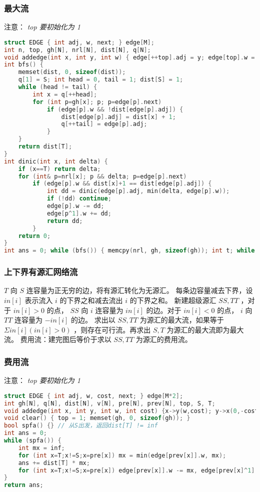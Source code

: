\documentclass{article}
\begin{document}
\subsubsection{最大流}
注意： \emph{top 要初始化为 1}
\begin{lstlisting}[language=C++]
struct EDGE { int adj, w, next; } edge[M];
int n, top, gh[N], nrl[N], dist[N], q[N];
void addedge(int x, int y, int w) { edge[++top].adj = y; edge[top].w = w; edge[top].next = gh[x]; gh[x] = top; edge[++top].adj = x; edge[top].w = 0; edge[top].next = gh[y]; gh[y] = top; }
int bfs() {
	memset(dist, 0, sizeof(dist));
	q[1] = S; int head = 0, tail = 1; dist[S] = 1;
	while (head != tail) {
		int x = q[++head];
		for (int p=gh[x]; p; p=edge[p].next)
			if (edge[p].w && !dist[edge[p].adj]) {
				dist[edge[p].adj] = dist[x] + 1;
				q[++tail] = edge[p].adj;
			}
	}
	return dist[T];
}
int dinic(int x, int delta) {
	if (x==T) return delta;
	for (int& p=nrl[x]; p && delta; p=edge[p].next)
		if (edge[p].w && dist[x]+1 == dist[edge[p].adj]) {
			int dd = dinic(edge[p].adj, min(delta, edge[p].w));
			if (!dd) continue;
			edge[p].w -= dd;
			edge[p^1].w += dd;
			return dd;
		}
	return 0;
}
int ans = 0; while (bfs()) { memcpy(nrl, gh, sizeof(gh)); int t; while (t = dinic(S, inf)) ans += t; } return ans;
\end{lstlisting}
\subsubsection{上下界有源汇网络流}

$T$ 向 $S$ 连容量为正无穷的边，将有源汇转化为无源汇。
每条边容量减去下界，设 $in[i]$ 表示流入 $i$ 的下界之和减去流出 $i$ 的下界之和。  
新建超级源汇 $SS, TT$ ，对于 $in[i] > 0$ 的点， $SS$ 向 $i$ 连容量为 $in[i]$ 的边。对于 $in[i] < 0$ 的点， $i$ 向 $TT$ 连容量为 $-in[i]$ 的边。 
求出以 $SS, TT$ 为源汇的最大流，如果等于 $\Sigma in[i] (in[i]>0)$ ，则存在可行流。再求出 $S, T$ 为源汇的最大流即为最大流。 
费用流：建完图后等价于求以 $SS, TT$ 为源汇的费用流。

\subsubsection{费用流}
注意： \emph{top 要初始化为 1}
\begin{lstlisting}[language=C++]
struct EDGE { int adj, w, cost, next; } edge[M*2];
int gh[N], q[N], dist[N], v[N], pre[N], prev[N], top, S, T;
void addedge(int x, int y, int w, int cost) {x->y(w,cost); y->x(0,-cost);}
void clear() { top = 1; memset(gh, 0, sizeof(gh)); }
bool spfa() {} // 从S出发，返回dist[T] != inf
int ans = 0;
while (spfa()) {
	int mx = inf;
	for (int x=T;x!=S;x=pre[x]) mx = min(edge[prev[x]].w, mx);
	ans += dist[T] * mx; 
	for (int x=T;x!=S;x=pre[x]) edge[prev[x]].w -= mx, edge[prev[x]^1].w += mx;
}
return ans;
\end{lstlisting}
\end{document}
